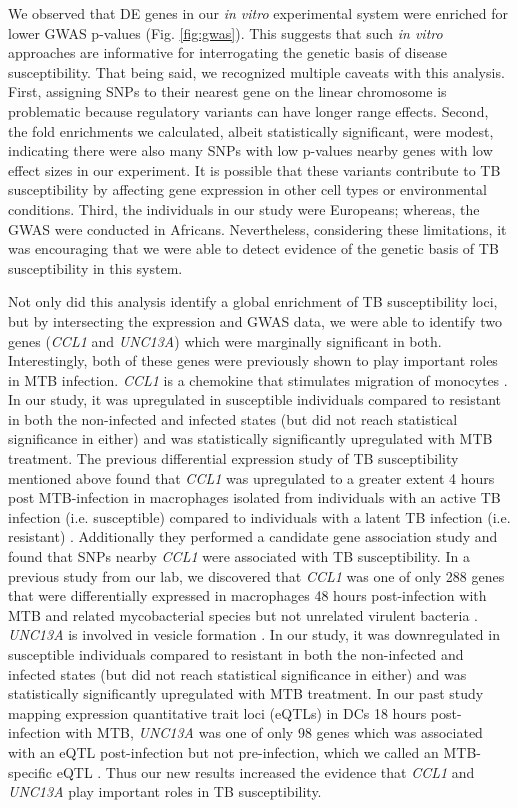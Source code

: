 \documentclass[fleqn,10pt]{wlscirep}
\begin{document}
We observed that DE genes in our \emph{in vitro} experimental system
were enriched for lower GWAS p-values (Fig. \ref{fig:gwas}). This
suggests that such \emph{in vitro} approaches are informative for
interrogating the genetic basis of disease susceptibility. That being
said, we recognized multiple caveats with this analysis. First,
assigning SNPs to their nearest gene on the linear chromosome is
problematic because regulatory variants can have longer range effects.
Second, the fold enrichments we calculated, albeit statistically
significant, were modest, indicating there were also many SNPs with
low p-values nearby genes with low effect sizes in our experiment. It
is possible that these variants contribute to TB susceptibility by
affecting gene expression in other cell types or environmental
conditions. Third, the individuals in our study were Europeans;
whereas, the GWAS were conducted in Africans. Nevertheless,
considering these limitations, it was encouraging that we were able to
detect evidence of the genetic basis of TB susceptibility in this
system.

Not only did this analysis identify a global enrichment of TB
susceptibility loci, but by intersecting the expression and GWAS data,
we were able to identify two genes (\emph{CCL1} and \emph{UNC13A})
which were marginally significant in both. Interestingly, both of
these genes were previously shown to play important roles in MTB
infection. \emph{CCL1} is a chemokine that stimulates migration of
monocytes \cite{Miller1992}. In our study, it was upregulated in
susceptible individuals compared to resistant in both the non-infected
and infected states (but did not reach statistical significance in
either) and was statistically significantly upregulated with MTB
treatment. The previous differential expression study of TB
susceptibility mentioned above found that \emph{CCL1} was upregulated
to a greater extent 4 hours post MTB-infection in macrophages isolated
from individuals with an active TB infection (i.e. susceptible)
compared to individuals with a latent TB infection (i.e. resistant)
\cite{Thuong2008}. Additionally they performed a candidate gene
association study and found that SNPs nearby \emph{CCL1} were
associated with TB susceptibility. In a previous study from our lab,
we discovered that \emph{CCL1} was one of only 288 genes that were
differentially expressed in macrophages 48 hours post-infection with
MTB and related mycobacterial species but not unrelated virulent
bacteria \cite{Blischak2015}. \emph{UNC13A} is involved in vesicle
formation \cite{Sudhof2004}. In our study, it was downregulated in
susceptible individuals compared to resistant in both the non-infected
and infected states (but did not reach statistical significance in
either) and was statistically significantly upregulated with MTB
treatment. In our past study mapping expression quantitative trait
loci (eQTLs) in DCs 18 hours post-infection with MTB, \emph{UNC13A}
was one of only 98 genes which was associated with an eQTL
post-infection but not pre-infection, which we called an MTB-specific
eQTL \cite{Barreiro2012}. Thus our new results increased the evidence
that \emph{CCL1} and \emph{UNC13A} play important roles in TB
susceptibility.
\end{document}
